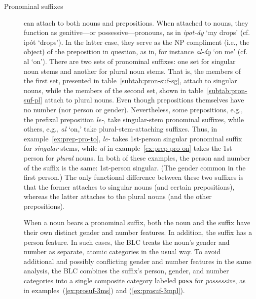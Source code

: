 \begin{description}
\item[Pronominal suffixes] can attach to both nouns and prepositions. When attached to nouns, they function as genitive---or possessive---pronouns, as in \textit{ipot-\'{a}y} `my drops' (cf. ip\'{o}t `drops').
In the latter case, they serve as the NP compliment (i.e., the object) of the preposition 
in question, as in, for instance \textit{al-\'{a}y} `on me' (cf. al `on').
There are two sets
of pronominal suffixes: one set for singular noun stems and another for plural noun stems. 
That is, the members of the first set, presented in table~\ref{subtab:pron-suf-sg}, 
attach to singular nouns, while the members of the second set, shown in table~\ref{subtab:pron-suf-pl} 
attach to plural nouns. 
Even though prepositions themselves have no number (nor person or gender). 
Nevertheless, some prepositions, e.g., the prefixal preposition \textit{le-}, 
take singular-stem pronominal suffixes, while others, e.g., \textit{al} `on,'
take plural-stem-attaching suffixes. Thus, in example~\ref{ex:prep-pro-to}, 
\textit{le-} takes 1st-person singular pronominal suffix for \emph{singular} stems, 
while \textit{al} in example~\ref{ex:prep-pro-on} takes the 1st-person 
for \emph{plural} nouns. In both of these examples, the person and number of 
the suffix is the same: 1st-person singular. (The gender common in the first person.)
The only functional difference between these two suffixes is that the former 
attaches to singular nouns (and certain prepositions), whereas the latter 
attaches to the plural nouns (and the other prepositions). 

When a noun bears a pronominal suffix, both the noun and the suffix have their 
own distinct gender and number features. In addition, the suffix has a person feature. 
In such cases, the BLC treats the noun's gender and number as separate, atomic
categories in the usual way. To avoid additional and possibly conflicting gender 
and number features in the same
analysis, the BLC combines the suffix's person, gender, and number categories into 
a single composite category labeled \texttt{poss} for \textit{possessive}, as in 
examples~(\ref{ex:prosuf-3ms}) and (\ref{ex:prosuf-3mpl}).


\end{description}
